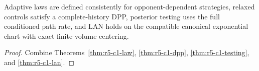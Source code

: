 \begin{theorem}
\label{thm:r5-c1-main}
Adaptive laws are defined consistently for opponent-dependent strategies,
relaxed controls satisfy a complete-history DPP, posterior testing uses the
full conditioned path rate, and LAN holds on the compatible canonical
exponential chart with exact finite-volume centering.
\end{theorem}

\begin{proof}
Combine Theorems~\ref{thm:r5-c1-law},
\ref{thm:r5-c1-dpp}, \ref{thm:r5-c1-testing}, and
\ref{thm:r5-c1-lan}.
\end{proof}
